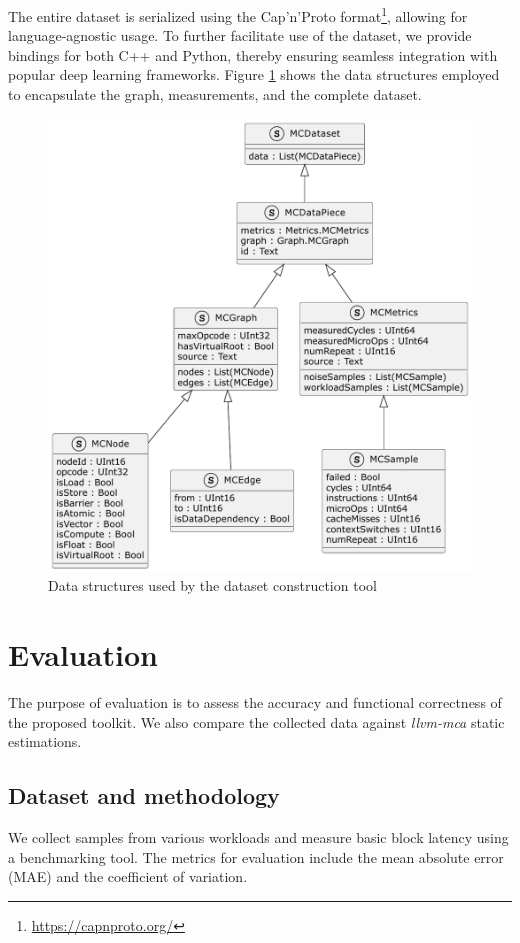 The entire dataset is serialized using the Cap'n'Proto format\footnote{\url{https://capnproto.org/}},
allowing for language-agnostic usage. To further facilitate use of the dataset, we provide bindings for
both C++ and Python, thereby ensuring seamless integration with popular deep learning frameworks. Figure
\ref{fig:datastruct} shows the data structures employed to encapsulate the graph, measurements, and the
complete dataset.

\begin{figure}[h]
  \centering
  \includegraphics[width=0.9\columnwidth]{data_structures}
  \caption{Data structures used by the dataset construction tool}
  \label{fig:datastruct}
\end{figure}

\section{Evaluation}

The purpose of evaluation is to assess the accuracy and functional correctness of the proposed toolkit.
We also compare the collected data against \textit{llvm-mca} static estimations.

\subsection{Dataset and methodology}
We collect samples from various workloads and measure basic block latency using a benchmarking tool.
The metrics for evaluation include the mean absolute error (MAE) and the coefficient of variation.

